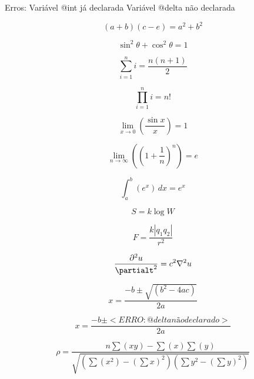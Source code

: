 Erros: 
Variável @int já declarada
Variável @delta não declarada

$$\left(a+b\right)\left(c-e\right)=a^2+b^2$$

$$\sin^{2} \theta+\cos^{2} \theta=1$$

$$\sum_{i=1}^{n} i=\frac{n\left(n+1\right)}{2}$$

$$\prod_{i=1}^{n} i=n!$$

$$\lim_{x \to 0} (\frac{\sin x}{x})=1$$

$$\lim_{n \to \infty} (\left(1+\frac{1}{n}\right)^n)=e$$

$$\int_{a}^{b} (e^x) \, dx=e^x$$

$$S=k\log W$$

$$F=\frac{k\left|q_{1}q_{2}\right|}{r^2}$$

$$\frac{\partial^{2} u}{\partialt^{2}}=c^2\nabla^2u$$

$$x=\frac{-b\pm \sqrt{(b^2-4ac)}}{2a}$$

$$x=\frac{-b\pm <ERRO: @delta não declarado>}{2a}$$

$$\rho=\frac{n\sum (xy)-\sum (x)\sum (y)}{\sqrt{\left(\sum (x^2)-\left(\sum x\right)^2\right)\left(\sum y^2-\left(\sum y\right)^2\right)}}$$

